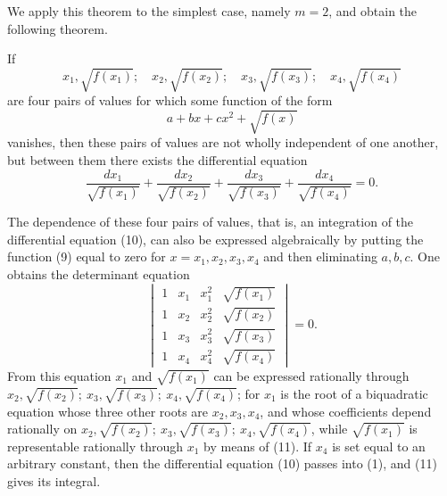 \documentclass[11pt]{article}
\begin{document}
We apply this theorem to the simplest case, namely $m=2$, and obtain the following theorem.

If
\begin{equation}
x_1,\sqrt{f(x_1)};\quad x_2,\sqrt{f(x_2)};\quad
x_3,\sqrt{f(x_3)};\quad x_4,\sqrt{f(x_4)}
\tag{8}
\end{equation}
are four pairs of values for which some function of the form
\begin{equation}
a+bx+cx^2+\sqrt{f(x)}
\tag{9}
\end{equation}
vanishes, then these pairs of values are not wholly independent of one another, but between them there exists the differential equation
\begin{equation}
\frac{dx_1}{\sqrt{f(x_1)}}+
\frac{dx_2}{\sqrt{f(x_2)}}+
\frac{dx_3}{\sqrt{f(x_3)}}+
\frac{dx_4}{\sqrt{f(x_4)}}=0.
\tag{10}
\end{equation}

The dependence of these four pairs of values, that is, an integration of the differential equation (10), can also be expressed algebraically by putting the function (9) equal to zero for $x=x_1,x_2,x_3,x_4$ and then eliminating $a,b,c$. One obtains the determinant equation
\begin{equation}
\begin{vmatrix}
1&x_1&x_1^2&\sqrt{f(x_1)}\\
1&x_2&x_2^2&\sqrt{f(x_2)}\\
1&x_3&x_3^2&\sqrt{f(x_3)}\\
1&x_4&x_4^2&\sqrt{f(x_4)}
\end{vmatrix}=0.
\tag{11}
\end{equation}
From this equation $x_1$ and $\sqrt{f(x_1)}$ can be expressed rationally through $x_2,\sqrt{f(x_2)};\ x_3,\sqrt{f(x_3)};\ x_4,\sqrt{f(x_4)}$; for $x_1$ is the root of a biquadratic equation whose three other roots are $x_2,x_3,x_4$, and whose coefficients depend rationally on $x_2,\sqrt{f(x_2)};\ x_3,\sqrt{f(x_3)};\ x_4,\sqrt{f(x_4)}$, while $\sqrt{f(x_1)}$ is representable rationally through $x_1$ by means of (11). If $x_4$ is set equal to an arbitrary constant, then the differential equation (10) passes into (1), and (11) gives its integral.
\end{document}
